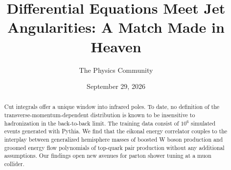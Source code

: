 \documentclass[11pt]{article}
\title{Differential Equations Meet Jet Angularities: A Match Made in Heaven}
\author{The Physics Community}
\date{September 29, 2026}
\begin{document}
\maketitle
\begin{abstract}
Cut integrals offer a unique window into infrared poles. To date, no
definition of the transverse-momentum-dependent distribution is known to
be insensitive to hadronization in the back-to-back limit. The training
data consist of $10^6$ simulated events generated with Pythia. We find
that the eikonal energy correlator couples to the interplay between
generalized hemisphere masses of boosted W boson production and groomed
energy flow polynomials of top-quark pair production without any
additional assumptions. Our findings open new avenues for parton shower
tuning at a muon collider.
\end{abstract}
\tableofcontents



\nocite{*}


\end{document}
